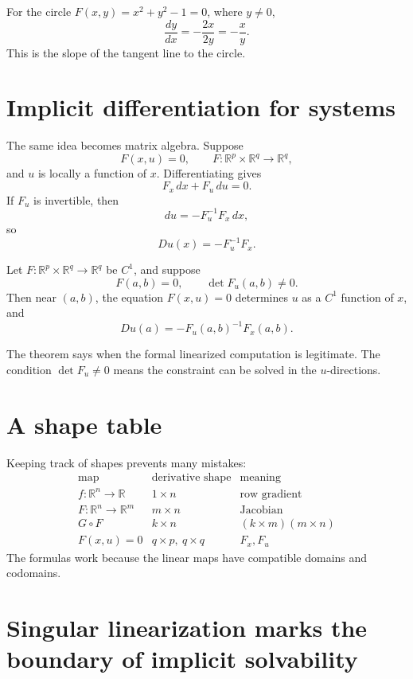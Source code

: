 \begin{example}
For the circle \(F(x,y)=x^2+y^2-1=0\), where \(y\ne0\),
\[
  \frac{dy}{dx}=-\frac{2x}{2y}=-\frac{x}{y}.
\]
This is the slope of the tangent line to the circle.
\end{example}

\section{Implicit differentiation for systems}

The same idea becomes matrix algebra.  Suppose
\[
  F(x,u)=0,\qquad
  F:\mathbb R^p\times\mathbb R^q\to\mathbb R^q,
\]
and \(u\) is locally a function of \(x\).  Differentiating gives
\[
  F_x\,dx+F_u\,du=0.
\]
If \(F_u\) is invertible, then
\[
  du=-F_u^{-1}F_x\,dx,
\]
so
\[
  Du(x)=-F_u^{-1}F_x.
\]

\begin{theorem}
Let \(F:\mathbb R^p\times\mathbb R^q\to\mathbb R^q\) be \(C^1\), and suppose
\[
  F(a,b)=0,\qquad \det F_u(a,b)\ne0.
\]
Then near \((a,b)\), the equation \(F(x,u)=0\) determines \(u\) as a \(C^1\) function of \(x\), and
\[
  Du(a)=-F_u(a,b)^{-1}F_x(a,b).
\]
\end{theorem}

The theorem says when the formal linearized computation is legitimate.  The condition \(\det F_u\ne0\) means the constraint can be solved in the \(u\)-directions.

\section{A shape table}

Keeping track of shapes prevents many mistakes:
\[
\begin{array}{c|c|c}
\text{map} & \text{derivative shape} & \text{meaning}\\
\hline
f:\mathbb R^n\to\mathbb R & 1\times n & \text{row gradient}\\
F:\mathbb R^n\to\mathbb R^m & m\times n & \text{Jacobian}\\
G\circ F & k\times n & (k\times m)(m\times n)\\
F(x,u)=0 & q\times p,\ q\times q & F_x,F_u
\end{array}
\]
The formulas work because the linear maps have compatible domains and codomains.

\section{Singular linearization marks the boundary of implicit solvability}

